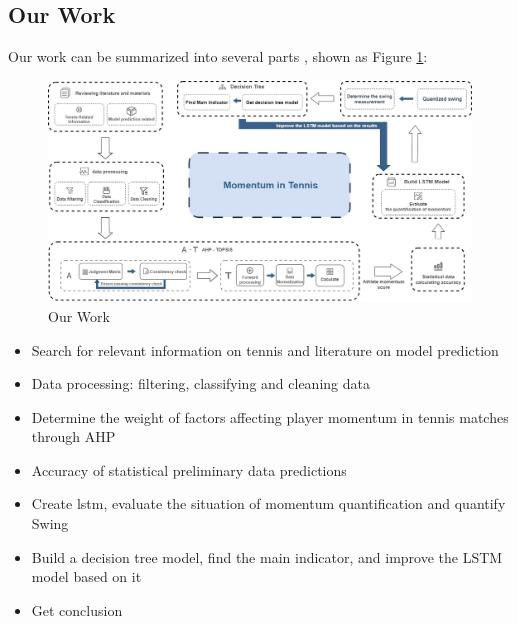\subsection{Our Work}
Our work can be summarized into several parts , shown as Figure \ref{fig:OurWork}:
\begin{figure}[b!]
    \centering
    \includegraphics[width=1\linewidth]{figure/OurWork.jpg}
    \caption{\centering Our Work}
    \label{fig:OurWork}
\end{figure}
\begin{itemize}
    \item Search for relevant information on tennis and literature on model prediction
    \item Data processing: filtering, classifying and cleaning data
    \item Determine the weight of factors affecting player momentum in tennis matches through AHP
    \item Accuracy of statistical preliminary data predictions
    \item Create lstm, evaluate the situation of momentum quantification and quantify Swing
    \item Build a decision tree model, find the main indicator, and improve the LSTM model based on it
    \item Get conclusion
\end{itemize}
